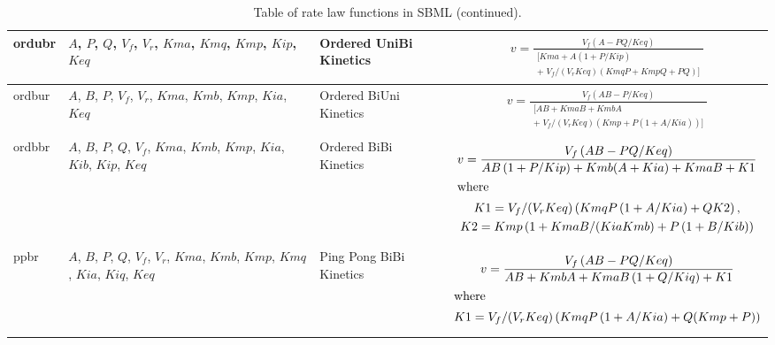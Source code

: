 \documentclass[10pt]{cek-article}
\begin{document}
\begin{table}[ht]
\begin{tabular}{|p{0.4in}|>{\raggedright}m{0.77in}|>{\raggedright}m{1.3in}|m{3.4in}|}
ordubr & $A$, $P$, $Q$, $V_f$, $V_r$, $Kma$, $Kmq$, $Kmp$, $Kip$,
$Keq$ & Ordered UniBi Kinetics &
\begin{gather*}
v = \frac{V_f \left( A - P Q/Keq\right)}{\begin{split}
\biggl[ Kma + A \left( 1 + P/Kip\right) \\
+\; V_f/(V_r Keq)
\left( Kmq P + Kmp Q + P Q\right) \biggr]
\end{split}}
\end{gather*}
\\ \hline

ordbur & $A$, $B$, $P$, $V_f$, $V_r$, $Kma$, $Kmb$, $Kmp$, $Kia$,
$Keq$ & Ordered BiUni Kinetics &
\begin{gather*}
v = \frac{V_f \left( A B -
P/Keq\right)}{\begin{split}
\biggl[ A B + Kma B + Kmb A \\
+\; V_f/(V_r Keq) \left( Kmp + P
\left( 1 + A/Kia\right) \right) \biggr]
\end{split}}
\end{gather*}
\\ \hline

ordbbr & $A$, $B$, $P$, $Q$, $V_f$, $Kma$, $Kmb$, $Kmp$, $Kia$,
$Kib$, $Kip$, $Keq$ & Ordered BiBi Kinetics &
\begin{gather*}
v = \frac{V_f
\left( A B - P Q/Keq\right) }{A B \left( 1 + P/Kip\right) + Kmb
(A + Kia) + Kma B + K1} \\
\intertext{where}
K1 = V_f / (V_r Keq) \left( Kmq P \left( 1 + A/Kia\right) + Q K2 \right) ,\\
K2 = Kmp \left( 1 + Kma B /(Kia Kmb) + P \left( 1 + B/Kib \right) \right)
\end{gather*}
\\ \hline

ppbr & $A$, $B$, $P$, $Q$, $V_f$, $V_r$, $Kma$, $Kmb$, $Kmp$, $Kmq$,
$Kia$, $Kiq$, $Keq$ & Ping Pong BiBi Kinetics &
\begin{gather*}
v = \frac{V_f
\left( A B - P Q /Keq \right) }{A B + Kmb A + Kma B \left( 1 +
  Q/Kiq\right)+ K1 } \\
\intertext{where}
K1 = V_f/(V_r Keq)
\left( Kmq P \left( 1 + A/Kia \right) + Q (Kmp + P) \right)
\end{gather*}
\\ \hline

\end{tabular}
\caption{Table of rate law functions in SBML (continued).}
\end{table}
\end{document}

